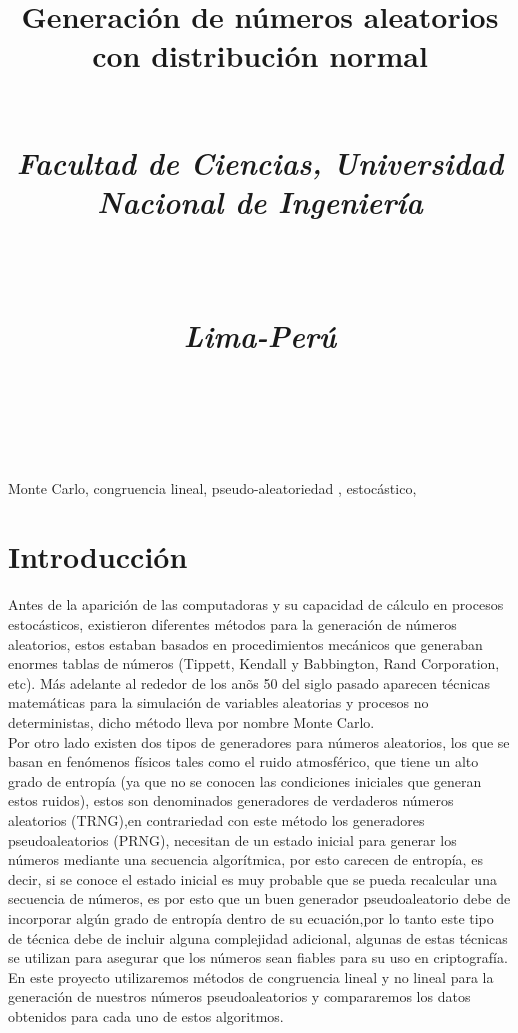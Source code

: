\documentclass[conference]{IEEEtran}
\begin{document}
\title{Generaci\'on de n\'umeros aleatorios con distribuci\'on normal\\
\\
\centerline{\textit{Facultad de Ciencias, Universidad Nacional de Ingenier\'ia}}\\
\centerline{\textit{Lima-Per\'u}}\\
\author{}
}
\maketitle
\begin{abstract}

\end{abstract}
\begin{IEEEkeywords}
Monte Carlo, congruencia lineal, pseudo-aleatoriedad , estoc\'astico, 
\end{IEEEkeywords}

\section{Introducci\'on}
Antes de la aparici\'on de las computadoras y su capacidad de c\'alculo en procesos estoc\'asticos, existieron diferentes m\'etodos para la generaci\'on de n\'umeros aleatorios, estos estaban basados en procedimientos mec\'anicos que generaban enormes tablas de n\'umeros (Tippett, Kendall y Babbington, Rand Corporation, etc). M\'as adelante al rededor de los an\~os 50 del siglo pasado aparecen t\'ecnicas matem\'aticas para la simulaci\'on de variables aleatorias y procesos no deterministas, dicho m\'etodo lleva por nombre Monte Carlo.\\
Por otro lado existen dos tipos de generadores para n\'umeros aleatorios, los que se basan en fen\'omenos f\'isicos tales como el ruido atmosf\'erico, que tiene un alto grado de entrop\'ia (ya que no se conocen las condiciones iniciales que generan estos ruidos), estos son denominados generadores de verdaderos n\'umeros aleatorios (TRNG),en contrariedad con este m\'etodo los generadores pseudoaleatorios (PRNG), necesitan de un estado inicial para generar los n\'umeros mediante una secuencia algor\'itmica, por esto carecen de entrop\'ia, es decir, si se conoce el estado inicial es muy probable que se pueda recalcular una secuencia de n\'umeros, es por esto que un buen generador pseudoaleatorio debe de incorporar alg\'un grado de entrop\'ia dentro de su ecuaci\'on,por lo tanto este tipo de t\'ecnica debe de incluir alguna complejidad adicional, algunas de estas t\'ecnicas se utilizan para asegurar que los n\'umeros sean fiables para su uso en criptograf\'ia.\\
En este proyecto utilizaremos m\'etodos de congruencia lineal y no lineal para la generaci\'on de nuestros n\'umeros pseudoaleatorios y compararemos los datos obtenidos para cada uno de estos algoritmos.
\end{document}
